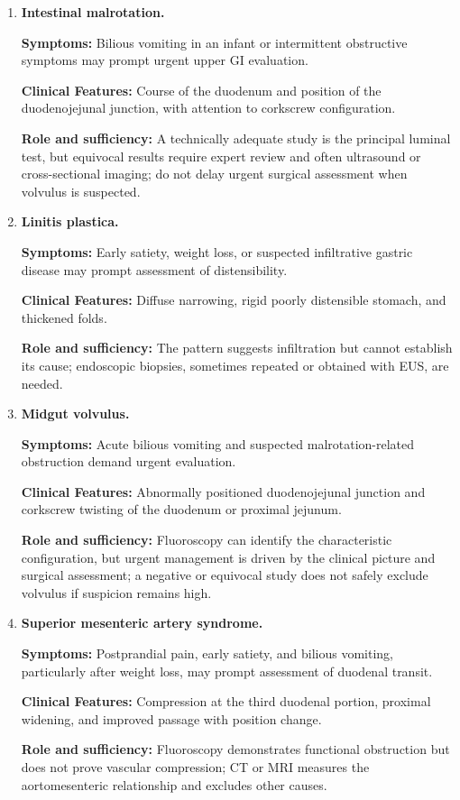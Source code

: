 \begin{enumerate}[leftmargin=*,itemsep=0.45em,topsep=0.4em]
\item \textbf{Intestinal malrotation.}\par\noindent\textbf{Symptoms:} Bilious vomiting in an infant or intermittent obstructive symptoms may prompt urgent upper GI evaluation.\par\noindent\textbf{Clinical Features:} Course of the duodenum and position of the duodenojejunal junction, with attention to corkscrew configuration.\par\noindent\textbf{Role and sufficiency:} A technically adequate study is the principal luminal test, but equivocal results require expert review and often ultrasound or cross-sectional imaging; do not delay urgent surgical assessment when volvulus is suspected.
\item \textbf{Linitis plastica.}\par\noindent\textbf{Symptoms:} Early satiety, weight loss, or suspected infiltrative gastric disease may prompt assessment of distensibility.\par\noindent\textbf{Clinical Features:} Diffuse narrowing, rigid poorly distensible stomach, and thickened folds.\par\noindent\textbf{Role and sufficiency:} The pattern suggests infiltration but cannot establish its cause; endoscopic biopsies, sometimes repeated or obtained with EUS, are needed.
\item \textbf{Midgut volvulus.}\par\noindent\textbf{Symptoms:} Acute bilious vomiting and suspected malrotation-related obstruction demand urgent evaluation.\par\noindent\textbf{Clinical Features:} Abnormally positioned duodenojejunal junction and corkscrew twisting of the duodenum or proximal jejunum.\par\noindent\textbf{Role and sufficiency:} Fluoroscopy can identify the characteristic configuration, but urgent management is driven by the clinical picture and surgical assessment; a negative or equivocal study does not safely exclude volvulus if suspicion remains high.
\item \textbf{Superior mesenteric artery syndrome.}\par\noindent\textbf{Symptoms:} Postprandial pain, early satiety, and bilious vomiting, particularly after weight loss, may prompt assessment of duodenal transit.\par\noindent\textbf{Clinical Features:} Compression at the third duodenal portion, proximal widening, and improved passage with position change.\par\noindent\textbf{Role and sufficiency:} Fluoroscopy demonstrates functional obstruction but does not prove vascular compression; CT or MRI measures the aortomesenteric relationship and excludes other causes.
\end{enumerate}

